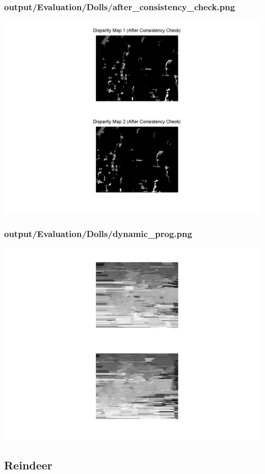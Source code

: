 \subsubsection{output/Evaluation/Dolls/after\_consistency\_check.png}
    \includegraphics[scale=0.5]{output/Evaluation/Dolls/after_consistency_check.png}

\subsubsection{output/Evaluation/Dolls/dynamic\_prog.png}
    \includegraphics[scale=0.5]{output/Evaluation/Dolls/dynamic_prog.png}

\subsection{Reindeer}

